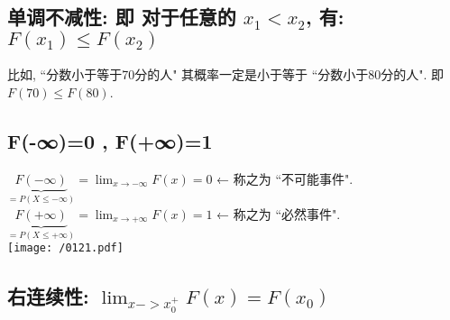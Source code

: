 \documentclass[UTF8]{ctexart}
\begin{document}
\subsection{单调不减性: 即 对于任意的 $x_1 < x_2$, 有: $F(x_1) \leq F(x_2)$}

比如, ``分数小于等于70分的人" 其概率一定是小于等于 ``分数小于80分的人". 即 $F(70) \leq F(80)$.



\subsection{F(-∞)=0 , F(+∞)=1}

$
\underset{=P(X\leq -\infty )}{\underbrace{F(-\infty )}}=\lim_{x\rightarrow -\infty}F(x)=0
$ ← 称之为 ``不可能事件". \\

$
\underset{=P(X\leq +\infty )}{\underbrace{F(+\infty )}}=\lim_{x\rightarrow +\infty}F(x)=1
$ ← 称之为 ``必然事件". \\

\texttt{[image: /0121.pdf]} \\


\subsection{右连续性: $\lim_{x -> x_0^+} F(x)=F(x_0)$ }


	
\end{document}
